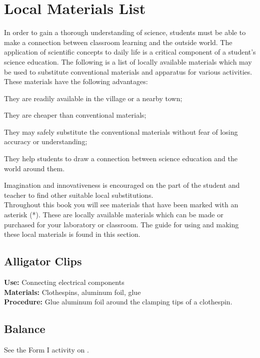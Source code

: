 \chapter{Local Materials List}
\label{cha:local-materials}

In order to gain a thorough understanding of science, students must be able to make a connection between classroom learning and the outside world. The application of scientific concepts to daily life is a critical component of a student's science education. The following is a list of locally available materials which may be used to substitute conventional materials and apparatus for various activities. These materials have the following advantages: 
\begin{itemize*}
\item They are readily available in the village or a nearby town;
\item They are cheaper than conventional materials; 
\item They may safely substitute the conventional materials without fear of losing accuracy or understanding; 
\item They help students to draw a connection between science education and the world around them.
\end{itemize*}
Imagination and innovativeness is encouraged on the part of the student and teacher to find other suitable local substitutions. \\

\noindent Throughout this book you will see materials that have been marked with an asterisk (*). These are locally available materials which can be made or purchased for your laboratory or classroom. The guide for using and making these local materials is found in this section.  

\section{Alligator Clips}
\vspace{-10pt}
\textbf{Use:} Connecting electrical components\\
\textbf{Materials:} Clothespins, aluminum foil, glue\\
\textbf{Procedure:} Glue aluminum foil around the clamping tips of a clothespin.

\section{Balance}
\vspace{-10pt}
See the Form I activity on .


